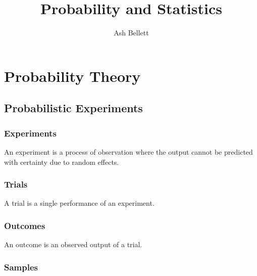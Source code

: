 \documentclass{article}
\title{\textbf{Probability and Statistics}}
\author{Ash Bellett}
\date{}
\begin{document}
\clearpage
\maketitle
\thispagestyle{empty}
\setcounter{page}{0}
\newpage
\tableofcontents
\setcounter{page}{0}
\newpage

\section{Probability Theory}

%

\subsection{Probabilistic Experiments}

\subsubsection{Experiments}

An experiment is a process of observation where the output cannot be predicted with certainty due to random effects.

\subsubsection{Trials}

A trial is a single performance of an experiment.

\subsubsection{Outcomes}

An outcome is an observed output of a trial.

\subsubsection{Samples}
\end{document}
